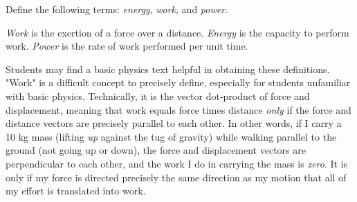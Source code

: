 

Define the following terms: {\it energy}, {\it work}, and {\it power}.







{\it Work} is the exertion of a force over a distance.  {\it Energy} is the capacity to perform work.  {\it Power} is the rate of work performed per unit time.







Students may find a basic physics text helpful in obtaining these definitions.  "Work" is a difficult concept to precisely define, especially for students unfamiliar with basic physics.  Technically, it is the vector dot-product of force and displacement, meaning that work equals force times distance {\it only} if the force and distance vectors are precisely parallel to each other.  In other words, if I carry a 10 kg mass (lifting {\it up} against the tug of gravity) while walking parallel to the ground (not going up or down), the force and displacement vectors are perpendicular to each other, and the work I do in carrying the mass is {\it zero}.  It is only if my force is directed precisely the same direction as my motion that all of my effort is translated into work.




